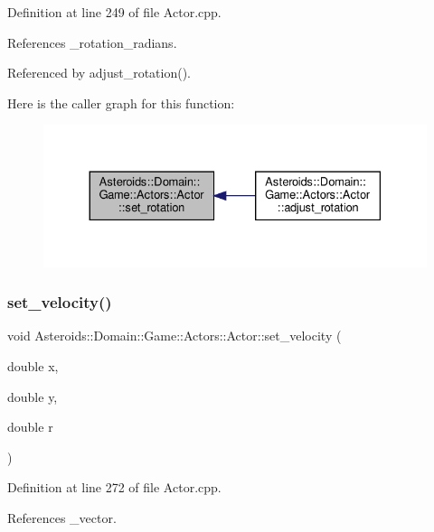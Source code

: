 Definition at line 249 of file Actor.\+cpp.



References \+\_\+rotation\+\_\+radians.



Referenced by adjust\+\_\+rotation().

Here is the caller graph for this function\+:\nopagebreak
\begin{figure}[H]
\begin{center}
\leavevmode
\includegraphics[width=330pt]{classAsteroids_1_1Domain_1_1Game_1_1Actors_1_1Actor_ad2687b72e2b05bebd6eb419f48d8ebba_icgraph}
\end{center}
\end{figure}
\mbox{\label{classAsteroids_1_1Domain_1_1Game_1_1Actors_1_1Actor_a21d68a9765d6bb40c2e5e083fcd57df6}} 
\subsubsection{\texorpdfstring{set\+\_\+velocity()}{set\_velocity()}}
{\footnotesize\ttfamily void Asteroids\+::\+Domain\+::\+Game\+::\+Actors\+::\+Actor\+::set\+\_\+velocity (\begin{DoxyParamCaption}\item[{double}]{x,  }\item[{double}]{y,  }\item[{double}]{r }\end{DoxyParamCaption})}



Definition at line 272 of file Actor.\+cpp.



References \+\_\+vector.

